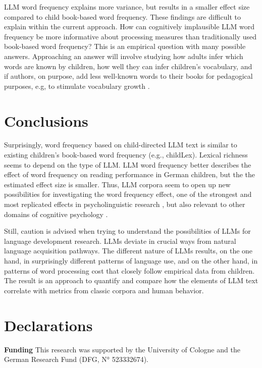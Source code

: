\documentclass[manuscript]{stjour}
\begin{document}
LLM word frequency explains more variance, but results in a smaller effect size compared to child book-based word frequency. These findings are difficult to explain within the current approach. How can cognitively implausible LLM word frequency be more informative about processing measures than traditionally used book-based word frequency? This is an empirical question with many possible answers. Approaching an answer will involve studying how adults infer which words are known by children, how well they can infer children's vocabulary, and if authors, on purpose, add less well-known words to their books for pedagogical purposes, e.g, to stimulate vocabulary growth \citep{korochkina_morphology_2025}. 


\section*{Conclusions}

Surprisingly, word frequency based on child-directed LLM text is similar to existing children's book-based word frequency (e.g., childLex). Lexical richness seems to depend on the type of LLM. LLM word frequency better describes the effect of word frequency on reading performance in German children, but the the estimated effect size is smaller. Thus, LLM corpora seem to open up new possibilities for investigating the word frequency effect, one of the strongest and most replicated effects in psycholinguistic research \citep{brysbaert_word_2018}, but also relevant to other domains of cognitive psychology \citep[i.e., object recognition][]{gregorova_access_2023}. 

Still, caution is advised when trying to understand the possibilities of LLMs for language development research. LLMs deviate in crucial ways from natural language acquisition pathways. The different nature of LLMs results, on the one hand, in surprisingly different patterns of language use, and on the other hand, in patterns of word processing cost that closely follow empirical data from children. The result is an approach to quantify and compare how the elements of LLM text correlate with metrics from classic corpora and human behavior.


\section*{Declarations}

\textbf{Funding} This research was supported by the University of Cologne and the German Research Fund (DFG, N° 523332674). 
\end{document}
